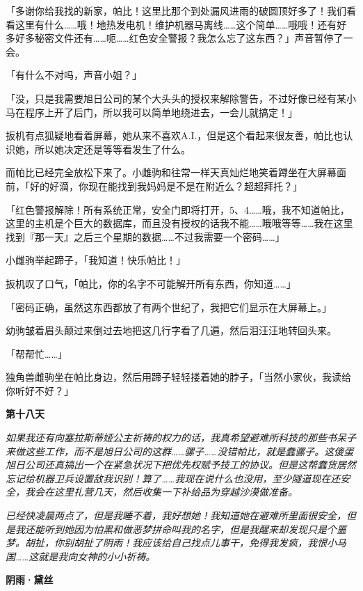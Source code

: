「多谢你给我找的新家，帕比！这里比那个到处漏风进雨的破圆顶好多了！我们看看这里有什么……哦！地热发电机！维护机器马离线……这个简单……哦哦！还有好多好多秘密文件还有……呃……红色安全警报？我怎么忘了这东西？」声音暂停了一会。

「有什么不对吗，声音小姐？」

「没，只是我需要旭日公司的某个大头头的授权来解除警告，不过好像已经有某小马在程序上开了后门，所以我可以简单地绕进去，一会儿就搞定！」

扳机有点狐疑地看着屏幕，她从来不喜欢A.I.，但是这个看起来很友善，帕比也认识她，所以她决定还是等等看发生了什么。

而帕比已经完全放松下来了。小雌驹和往常一样天真灿烂地笑着蹲坐在大屏幕面前，「好的好滴，你现在能找到我妈妈是不是在附近么？超超拜托？」

「红色警报解除！所有系统正常，安全门即将打开，5、4……哦，我不知道帕比，这里的主机是个巨大的数据库，而且没有授权的话我不能……哦哦等等……我在这里找到『那一天』之后三个星期的数据……不过我需要一个密码……」

小雌驹举起蹄子，「我知道！快乐帕比！」

扳机叹了口气，「帕比，你的名字不可能解开所有东西，你知道……」

「密码正确，虽然这东西都放了有两个世纪了，我把它们显示在大屏幕上。」

幼驹皱着眉头颠过来倒过去地把这几行字看了几遍，然后泪汪汪地转回头来。

「帮帮忙……」

独角兽雌驹坐在帕比身边，然后用蹄子轻轻搂着她的脖子，「当然小家伙，我读给你听好不好？」

\begin{center}
\textbf{第十八天}
\end{center}

\emph{如果我还有向塞拉斯蒂娅公主祈祷的权力的话，我真希望避难所科技的那些书呆子来做这些工作，而不是旭日公司的这群……骡子……没错帕比，就是蠢骡子。这傻蛋旭日公司还真搞出一个在紧急状况下把优先权赋予技工的协议。但是这帮蠢货居然忘记给机器卫兵设置敌我识别！算了……我现在说什么也没用，至少隧道现在还安全，我会在这里扎营几天，然后收集一下补给品为穿越沙漠做准备。}

\emph{已经快凌晨两点了，但是我睡不着，我好想她！我知道她在避难所里面很安全，但是我还能听到她因为怕黑和做恶梦拼命叫我的名字，但是我醒来却发现只是个噩梦。胡扯，你别胡扯了阴雨！我应该给自己找点儿事干，免得我发疯，我恨小马国……这就是我向女神的小小祈祷。}

\begin{flushright}
\textbf{阴雨·黛丝}
\end{flushright}


